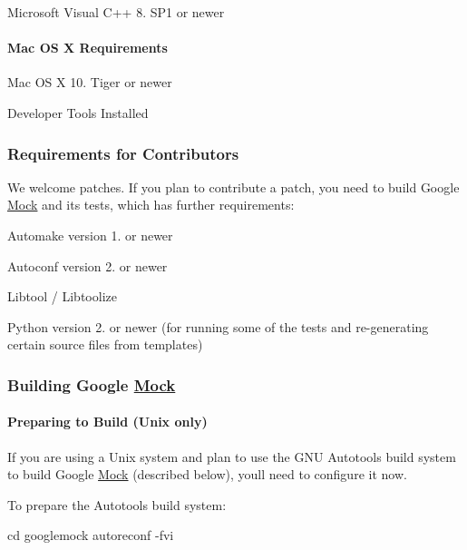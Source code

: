 \begin{DoxyItemize}
\item Microsoft Visual C++ 8. S\+P1 or newer
\end{DoxyItemize}

\paragraph*{Mac OS X Requirements}


\begin{DoxyItemize}
\item Mac OS X 10. Tiger or newer
\item Developer Tools Installed
\end{DoxyItemize}

\subsubsection*{Requirements for Contributors}

We welcome patches. If you plan to contribute a patch, you need to build Google \mbox{\hyperlink{class_mock}{Mock}} and its tests, which has further requirements\+:


\begin{DoxyItemize}
\item Automake version 1. or newer
\item Autoconf version 2. or newer
\item Libtool / Libtoolize
\item Python version 2. or newer (for running some of the tests and re-\/generating certain source files from templates)
\end{DoxyItemize}

\subsubsection*{Building Google \mbox{\hyperlink{class_mock}{Mock}}}

\paragraph*{Preparing to Build (Unix only)}

If you are using a Unix system and plan to use the G\+NU Autotools build system to build Google \mbox{\hyperlink{class_mock}{Mock}} (described below), you\textquotesingle{}ll need to configure it now.

To prepare the Autotools build system\+: \begin{DoxyVerb}cd googlemock
autoreconf -fvi
\end{DoxyVerb}


